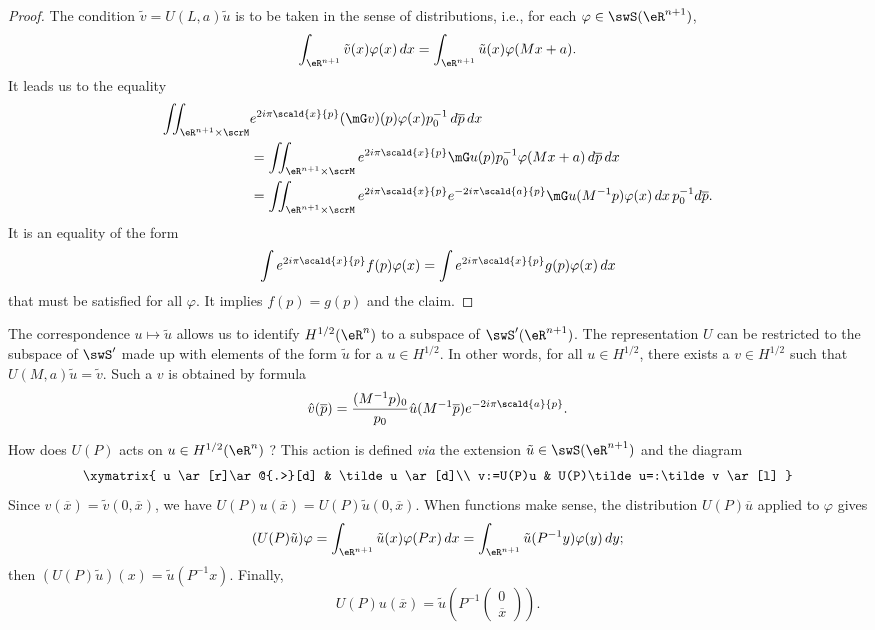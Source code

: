 \begin{proof}
The condition $\tilde v=U(L,a)\tilde u$ is to be taken in the sense of distributions, i.e., for each $\varphi\in\swS(\eR^{n+1})$,
\[ 
  \int_{\eR^{n+1}}\tilde v(x)\varphi(x)\,dx=\int_{\eR^{n+1}}\tilde u(x)\varphi(Mx+a).
\]
It leads us to the equality
\[ 
\begin{split}
  \iint_{\eR^{n+1}\times\scrM}& e^{2i\pi\scald{ x }{ p }}(\mG v)(p)\varphi(x)p_0^{-1}\,d\overline{p}\,dx\\
		&=\iint_{\eR^{n+1}\times\scrM} e^{2i\pi\scald{ x }{ p }}\mG u(p)p_0^{-1}\varphi(Mx+a)\,d\overline{p}\,dx\\
		&=\iint_{\eR^{n+1}\times\scrM} e^{2i\pi\scald{ x }{ p }} e^{-2i\pi\scald{ a }{ p }}\mG u(M^{-1}p)\varphi(x)\,dx\,p_0^{-1}d\overline{p}.
\end{split}
\]
It is an equality of the form
\[ 
  \int  e^{2i\pi\scald{ x }{ p }}f(p)\varphi(x)=\int e^{2i\pi\scald{ x }{ p }}g(p)\varphi(x)\,dx
\]
that must be satisfied for all $\varphi$. It implies $f(p)=g(p)$ and the claim.


\end{proof}

The correspondence $u\mapsto \tilde u$ allows us to identify $H^{1/2}(\eR^n)$ to a subspace of $\swS'(\eR^{n+1})$. The representation $U$ can be restricted to the subspace of $\swS'$ made up with elements of the form $\tilde u$ for a $u\in H^{1/2}$. In other words, for all $u\in H^{1/2}$, there exists a $v\in H^{1/2}$ such that $U(M,a)\tilde u=\tilde v$. Such a $v$ is obtained by formula
\[ 
  \hat v(\overline{p})=\frac{ (M^{-1}p)_0 }{ p_0 }\hat u(M^{-1}\overline{p}) e^{-2i\pi\scald{ a }{ p }}.
\]

How does $U(P)$ acts on $u\in H^{1/2}(\eR^n)$ ? This action is defined \emph{via} the extension $\tilde u\in\swS(\eR^{n+1})$ and the diagram
\[
\xymatrix{
 u \ar[r]\ar@{.>}[d]	&	\tilde u \ar[d]\\
v:=U(P)u		&	U(P)\tilde u=:\tilde v \ar[l]
}
\]
Since $v(\overline{x})=\tilde v(0,\overline{x})$, we have $U(P)u(\overline{x})=U(P)\tilde u(0,\overline{x})$. When functions make sense, the distribution $U(P)\overline{ u }$ applied to $\varphi$ gives
\[ 
  (U(P)\tilde u)\varphi=\int_{\eR^{n+1}}\tilde u(x)\varphi(Px)\,dx
		=\int_{\eR^{n+1}}\tilde u(P^{-1} y)\varphi(y)\,dy;
\]
then $(U(P)\tilde u)(x)=\tilde u(P^{-1}x)$. Finally,
\begin{equation}  \label{eq_Upxuxb}
  U(P)u(\overline{x})=\tilde u\left( 
P^{-1}
\begin{pmatrix}
0\\\overline{x}
\end{pmatrix}
 \right).
\end{equation}




